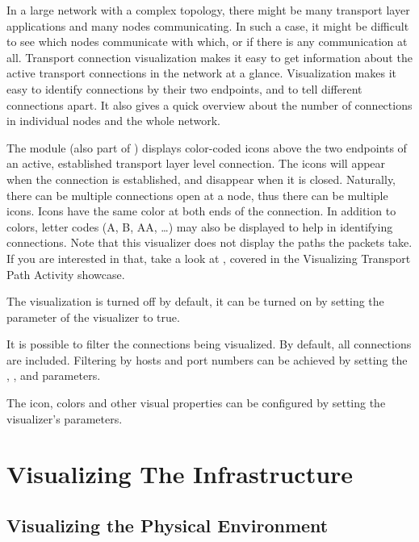 In a large network with a complex topology, there might be many transport layer
applications and many nodes communicating. In such a case, it might be difficult
to see which nodes communicate with which, or if there is any communication at
all. Transport connection visualization makes it easy to get information about
the active transport connections in the network at a glance. Visualization makes
it easy to identify connections by their two endpoints, and to tell different
connections apart. It also gives a quick overview about the number of
connections in individual nodes and the whole network.

The  module (also part of )
displays color-coded icons above the two endpoints of an active, established
transport layer level connection. The icons will appear when the connection is
established, and disappear when it is closed. Naturally, there can be multiple
connections open at a node, thus there can be multiple icons. Icons have the
same color at both ends of the connection. In addition to colors, letter codes
(A, B, AA, …) may also be displayed to help in identifying connections. Note
that this visualizer does not display the paths the packets take. If you are
interested in that, take a look at , covered in the
Visualizing Transport Path Activity showcase.

The visualization is turned off by default, it can be turned on by setting the
 parameter of the visualizer to true.

It is possible to filter the connections being visualized. By default, all
connections are included. Filtering by hosts and port numbers can be achieved by
setting the , ,
 and  parameters.

The icon, colors and other visual properties can be configured by setting the
visualizer's parameters.


\section{Visualizing The Infrastructure}
\label{sec:visualization:the-infrastructure}

\subsection{Visualizing the Physical Environment}
\label{sec:visualization:the-physical-environment}

